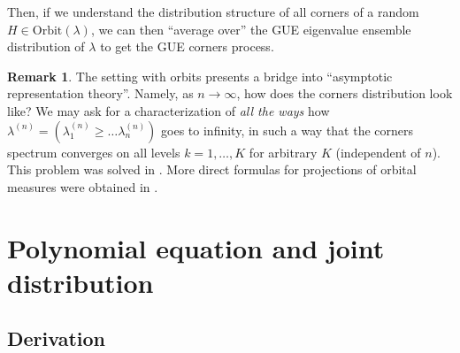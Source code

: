 \documentclass[letterpaper,11pt,oneside,reqno]{book}
\numberwithin{equation}{chapter}  %
\theoremstyle{definition}
\newtheorem{remark}[proposition]{Remark}
\begin{document}
Then, if we understand the distribution structure
of all corners of a random $H\in \mathrm{Orbit}(\lambda)$,
we can then ``average over'' the GUE eigenvalue ensemble distribution of $\lambda$
to get the GUE corners process.

\begin{remark}
	The setting with orbits presents a bridge into ``asymptotic representation theory''.
	Namely, as $n\to\infty$, how does the corners distribution look like?
	We may ask for a characterization of \emph{all the ways} how
	$\lambda^{(n)}=( \lambda_1^{(n)}\ge \ldots \lambda^{(n)}_n  )$
	goes to infinity, in such a way that the corners
	spectrum converges on all levels $k=1,\ldots,K $ for arbitrary $K$ (independent of
	$n$).
	This problem was solved in \cite{OlVer1996}.
	More direct formulas for projections of orbital measures
	were obtained in \cite{olshanski2013projections}.
\end{remark}


\section{Polynomial equation and joint distribution}

\subsection{Derivation}
\end{document}
